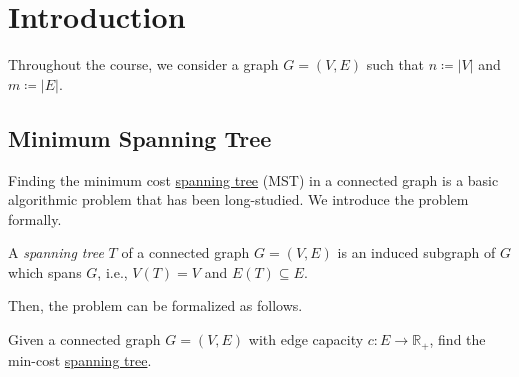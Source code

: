 \chapter{Introduction}
Throughout the course, we consider a graph \(G=(V, E)\) such that \(n \coloneqq \lvert V \rvert \) and \(m\coloneqq \lvert E \rvert \).




\section{Minimum Spanning Tree}
Finding the minimum cost \hyperref[def:spanning-tree]{spanning tree} (MST) in a connected graph is a basic algorithmic problem that has been long-studied. We introduce the problem formally.

\begin{definition}\label{def:spanning-tree}
	A \emph{spanning tree} \(T\) of a connected graph \(G =(V, E)\) is an induced subgraph of \(G\) which spans \(G\), i.e., \(V(T) = V\) and \(E(T) \subseteq E\).
\end{definition}

Then, the problem can be formalized as follows.

\begin{problem}\label{prb:MST}
Given a connected graph \(G=(V, E)\) with edge capacity \(c \colon E \to \mathbb{R} _+ \), find the min-cost \hyperref[def:spanning-tree]{spanning tree}.
\end{problem}

